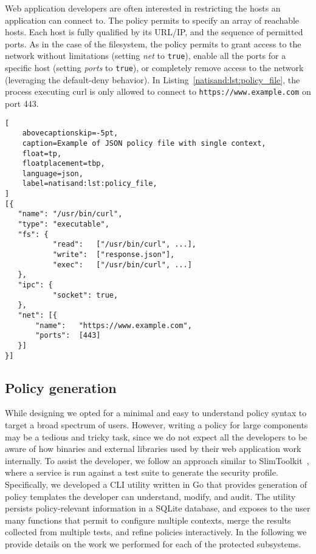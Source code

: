 Web application developers are often interested in restricting the
hosts an application can connect to. The policy permits to
specify an array of reachable hosts. Each host is fully qualified by
its URL/IP, and the sequence of permitted ports. As in the case of the
filesystem, the policy permits to grant access to the network without
limitations (setting {\em net} to {\tt true}), enable all the ports
for a specific host (setting {\em ports} to {\tt true}), or completely
remove access to the network (leveraging the default-deny
behavior). In Listing~\ref{natisand:lst:policy_file}, the process executing
curl is only allowed to connect to {\tt https://www.example.com} on
port 443.

\begin{lstlisting}[
    abovecaptionskip=-5pt,
    caption=Example of JSON policy file with single context,
    float=tp,
    floatplacement=tbp,
    language=json,
    label=natisand:lst:policy_file,
]
[{
   "name": "/usr/bin/curl",
   "type": "executable",
   "fs": {
           "read":   ["/usr/bin/curl", ...],
           "write":  ["response.json"],
           "exec":   ["/usr/bin/curl", ...]
   },
   "ipc": {
           "socket": true,
   },
   "net": [{
	   "name":   "https://www.example.com",
	   "ports":  [443]
   }]
}]
\end{lstlisting}


\subsection{Policy generation}
\label{sect:sci-ffi-policy-generation}

While designing \natisand we opted for a minimal and easy to understand
policy syntax to target a broad spectrum of users. However, writing a
policy for large components may be a tedious and tricky task, since we
do not expect all the developers to be aware of how binaries and
external libraries used by their web application work internally. To
assist the developer, we follow an approach similar to
SlimToolkit~\cite{slimtoolkit}, where a service is run against a test
suite to generate the security profile.
Specifically, we developed a CLI utility written in Go that provides
generation of policy templates the developer can understand,
modify, and audit. The utility persists policy-relevant information
in a SQLite database, and exposes to the user many functions that
permit to configure multiple contexts, merge the results collected
from multiple tests, and refine policies interactively.
In the following we provide details on
the work we performed for each of the protected subsystems.

